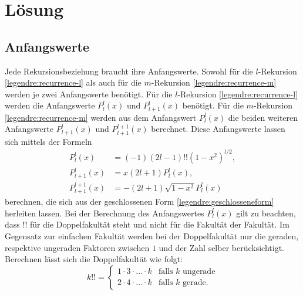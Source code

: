 %
%
%
\section{Lösung
\label{legendre:section:loesung}}
\subsection{Anfangswerte
\label{legendre:subsection:anfangswerte}}
Jede Rekursionsbeziehung braucht ihre Anfangswerte.
Sowohl für die $l$-Rekursion \eqref{legendre:recurrence-l} als auch für die $m$-Rekursion \eqref{legendre:recurrence-m} werden je zwei Anfangswerte benötigt.
Für die $l$-Rekursion \eqref{legendre:recurrence-l} werden die Anfangswerte $P^{l}_{l}(x)$ und $P^{l}_{l+1}(x)$ benötigt.
Für die $m$-Rekursion \eqref{legendre:recurrence-m} werden aus dem Anfangswert $P^{l}_{l}(x)$ die beiden weiteren Anfangswerte $P^{l}_{l+1}(x)$ und $P^{l+1}_{l+1}(x)$ berechnet.
Diese Anfangswerte lassen sich mittels der Formeln
\begin{equation}
\begin{aligned}
P^{l}_{l}(x)
&=(-1)(2l-1)!!(1-x^2)^{l/2},\\
P^{l}_{l+1}(x)
&=x(2l+1)P^{l}_{l}(x),\\
P^{l+1}_{l+1}(x)
&=-(2l+1)\sqrt{1-x^2}P^{l}_{l}(x)
\label{legendre:anfangswerte}
\end{aligned}
\end{equation}
berechnen, die sich aus der geschlossenen Form \eqref{legendre:geschlosseneform} herleiten lassen.
Bei der Berechnung des Anfangswertes $P^{l}_{l}(x)$ gilt zu beachten, dass $!!$ für die Doppelfakultät steht und nicht für die Fakultät der Fakultät.
%
Im Gegensatz zur einfachen Fakultät werden bei der Doppelfakultät nur die geraden, respektive ungeraden Faktoren zwischen $1$ und der Zahl selber berücksichtigt.
Berechnen lässt sich die Doppelfakultät wie folgt:
\begin{equation}
k!! = 
\begin{cases}
1 \cdot 3 \cdot \ldots \cdot k & \text{falls $k$ ungerade}\\
2 \cdot 4 \cdot \ldots \cdot k & \text{falls $k$ gerade.}
\end{cases}
\label{legendre:doppelfakultaet}
\end{equation}

